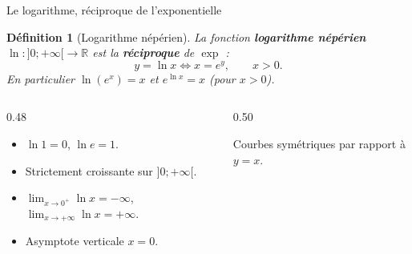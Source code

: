 \documentclass[10pt,aspectratio=169]{beamer}
\newcounter{dummy}
\numberwithin{dummy}{section}
\newtheorem{mydef}[dummy]{Définition}
\newcommand{\R}{\mathbb{R}}
\begin{document}
\begin{frame}{Le logarithme, réciproque de l'exponentielle}
\begin{mydef}[Logarithme népérien]
La fonction \textbf{logarithme népérien} $\ln:]0;+\infty[\to\R$
est la \textbf{réciproque} de $\exp$ :
\[
y=\ln x \iff x=e^y,\qquad x>0.
\]
En particulier $\ln(e^x)=x$ et $e^{\ln x}=x$ (pour $x>0$).
\end{mydef}

\begin{columns}[T]
\begin{column}{0.48\textwidth}
\begin{itemize}
    \item $\ln 1=0$, $\ln e=1$.
    \item Strictement croissante sur $]0;+\infty[$.
    \item $\displaystyle\lim_{x\to 0^+}\ln x=-\infty$,
          $\displaystyle\lim_{x\to+\infty}\ln x=+\infty$.
    \item Asymptote verticale $x=0$.
\end{itemize}
\end{column}
\begin{column}{0.50\textwidth}
\centering
{}
{\scriptsize Courbes symétriques par rapport à $y=x$.}
\end{column}
\end{columns}
\end{frame}
\end{document}
